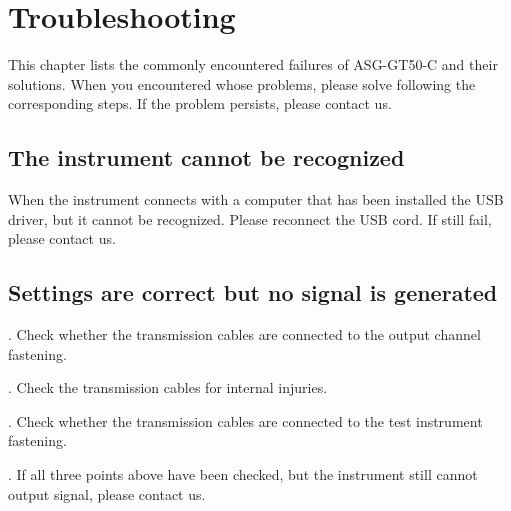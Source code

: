 \chapter{\heiti Troubleshooting}
This chapter lists the commonly encountered failures of ASG-GT50-C and their solutions. When you encountered whose problems, please solve following the corresponding steps. If the problem persists, please contact us.

\section{\heiti The instrument cannot be recognized}
When the instrument connects with a computer that has been installed the USB driver, but it cannot be recognized. Please reconnect the USB cord. If still fail, please contact us.

\section{\heiti Settings are correct but no signal is generated}
. Check whether the transmission cables are connected to the output channel fastening.

. Check the transmission cables for internal injuries.

. Check whether the transmission cables are connected to the test instrument fastening.

. If all three points above have been checked, but the instrument still cannot output signal, please contact us.  

